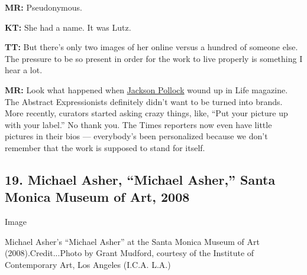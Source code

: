 \textbf{MR:} Pseudonymous.

\textbf{KT:} She had a name. It was Lutz.

\textbf{TT:} But there's only two images of her online versus a hundred
of someone else. The pressure to be so present in order for the work to
live properly is something I hear a lot.

\textbf{MR:} Look what happened when
\href{https://www.nytimes.com/topic/person/jackson-pollock}{Jackson
Pollock} wound up in Life magazine. The Abstract Expressionists
definitely didn't want to be turned into brands. More recently, curators
started asking crazy things, like, ``Put your picture up with your
label.'' No thank you. The Times reporters now even have little pictures
in their bios --- everybody's been personalized because we don't
remember that the work is supposed to stand for itself.

\hypertarget{19-michael-asher-michael-asher-santa-monica-museum-of-art-2008}{%
\subsection{19. Michael Asher, ``Michael Asher,'' Santa Monica Museum of
Art,
2008}\label{19-michael-asher-michael-asher-santa-monica-museum-of-art-2008}}

Image

Michael Asher's ``Michael Asher'' at the Santa Monica Museum of Art
(2008).Credit...Photo by Grant Mudford, courtesy of the Institute of
Contemporary Art, Los Angeles (I.C.A. L.A.)

